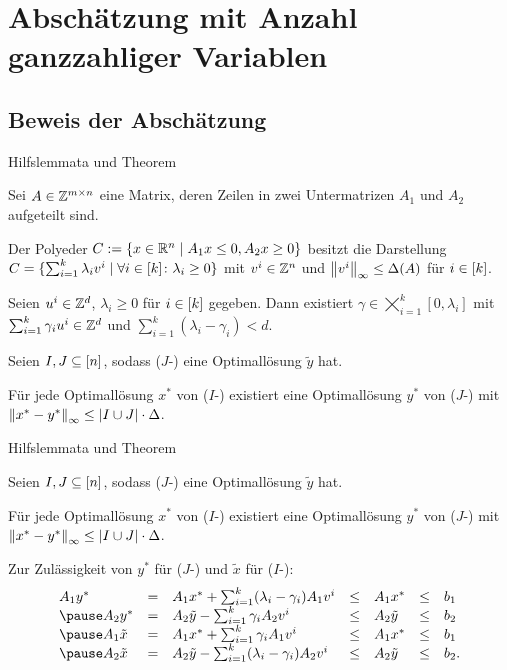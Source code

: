 \section{Abschätzung mit Anzahl ganzzahliger Variablen}

\subsection{Beweis der Abschätzung}

\begin{frame}{Hilfslemmata und Theorem}
	\renewcommand{\thisthmnumber}{2.10}
	\begin{lem}
		Sei $A\in\mathbb{Z}^{m\times n}$ eine Matrix, deren Zeilen in zwei Untermatrizen $A_1$ und $A_2$ aufgeteilt sind.
		
		Der Polyeder $C:=\{ x\in\mathbb{R}^n \mid A_1x\leq 0, A_2x\geq0 \}$ besitzt die Darstellung $C=\{\sum_{i=1}^k\lambda_i v^i \mid \forall i\in[k] \colon\lambda_i\geq0 \}$ mit $v^i\in\mathbb{Z}^n$ und $\left\lVert v^i\right\rVert_\infty\leq\Delta(A)$ für $i\in[k]$.
	\end{lem}
	\pause
	\renewcommand{\thisthmnumber}{2.9}
	\begin{lem}\label{lem:maxgamma}
		Seien $u^i\in\mathbb{Z}^d$, $\lambda_i\geq0$ für $i\in[k]$ gegeben.
		Dann existiert $\gamma\in\bigtimes_{i=1}^k [0,\lambda_i]$ mit $\sum_{i=1}^k \gamma_i u^i\in\mathbb{Z}^d$ und  $\sum_{i=1}^k(\lambda_i-\gamma_i)<d$.
	\end{lem}
	\pause
	\renewcommand{\thisthmnumber}{2.11}
	\begin{thm}\label{thm:theo2}
		Seien $I,J\subseteq[n]$, sodass ($J$-\MIPI) eine Optimallösung $\tilde{y}$ hat.
		
		Für jede Optimallösung $x^*$ von ($I$-\MIPI) existiert eine Optimallösung $y^*$ von ($J$-\MIPI) mit $\left\lVert x^*-y^*\right\rVert_\infty\leq\lvert I\cup J \rvert\cdot\Delta$.
	\end{thm}
\end{frame}

\begin{frame}{Hilfslemmata und Theorem}
\renewcommand{\thisthmnumber}{2.11}
\begin{thm}\label{thm:theo2}
Seien $I,J\subseteq[n]$, sodass ($J$-\MIPI) eine Optimallösung $\tilde{y}$ hat.

Für jede Optimallösung $x^*$ von ($I$-\MIPI) existiert eine Optimallösung $y^*$ von ($J$-\MIPI) mit $\left\lVert x^*-y^*\right\rVert_\infty\leq\lvert I\cup J \rvert\cdot\Delta$.
\end{thm}
Zur Zulässigkeit von $y^*$ für ($J$-\MIPI) und $\tilde{x}$ für ($I$-\MIPI):
\pause
$$
\begin{array}{lllllll}
A_1 y^*&=&A_1x^*+\sum_{i=1}^k(\lambda_i-\gamma_i)A_1v^i &\leq& A_1 x^* &\leq&b_1\\ \pause
A_2 y^*&=&A_2\tilde{y}-\sum_{i=1}^k\gamma_iA_2v^i &\leq& A_2\tilde{y} &\leq& b_2\\ \pause
A_1\tilde{x} &=&A_1x^*+\sum_{i=1}^k \gamma_iA_1v^i &\leq& A_1x^* &\leq&b_1\\ \pause
A_2\tilde{x} &=&A_2\tilde{y}-\sum_{i=1}^k(\lambda_i-\gamma_i)A_2v^i&\leq& A_2\tilde{y}&\leq& b_2.
\end{array}
$$
\end{frame}

